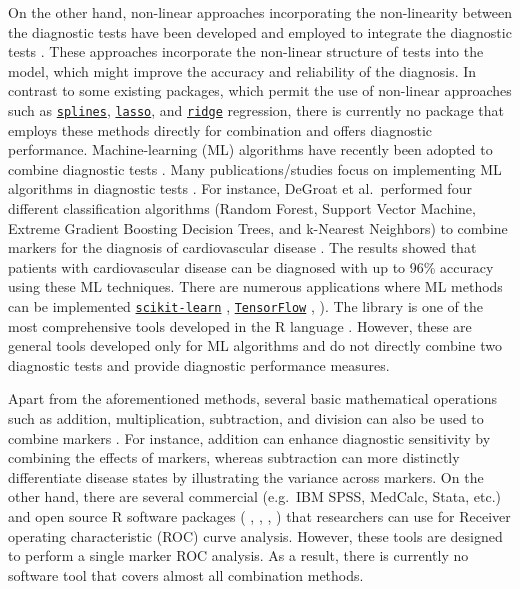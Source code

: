 On the other hand, non-linear approaches incorporating the non-linearity between the diagnostic tests have been developed and employed to integrate the diagnostic tests \citep{du2024likelihood, ghosh2005classification}. These approaches incorporate the non-linear structure of tests into the model, which might improve the accuracy and reliability of the diagnosis. In contrast to some existing packages, which permit the use of non-linear approaches such as \href{https://www.rdocumentation.org/packages/splines/versions/3.6.2}{\texttt{splines}}, \href{https://cran.r-project.org/web/packages/glmnet/index.html}{\texttt{lasso}}, and \href{https://cran.r-project.org/web/packages/glmnet/index.html}{\texttt{ridge}} regression, there is currently no package that employs these methods directly for combination and offers diagnostic performance. Machine-learning (ML) algorithms have recently been adopted to combine diagnostic tests \citep{ahsan2024advancements, sewak2024construction, agarwal2023artificial, prinzi2023explainable}. Many publications/studies focus on implementing ML algorithms in diagnostic tests \citep{salvetat2022game, salvetat2024ai, ganapathy2023comparison, alzyoud2024diagnosing, zararsiz2016statistical}. For instance, DeGroat et al.~performed four different classification algorithms (Random Forest, Support Vector Machine, Extreme Gradient Boosting Decision Trees, and k-Nearest Neighbors) to combine markers for the diagnosis of cardiovascular disease \citep{degroat2024discovering}. The results showed that patients with cardiovascular disease can be diagnosed with up to 96\% accuracy using these ML techniques. There are numerous applications where ML methods can be implemented \href{https://scikit-learn.org/stable/}{\texttt{scikit-learn}} \citep{pedregosa2011scikit}, \href{https://www.tensorflow.org/learn?hl=tr}{\texttt{TensorFlow}} \citep{tensorflow2015-whitepaper},  \citep{kuhn2008building}). The  library is one of the most comprehensive tools developed in the R language \citep{kuhn2008building}. However, these are general tools developed only for ML algorithms and do not directly combine two diagnostic tests and provide diagnostic performance measures.

Apart from the aforementioned methods, several basic mathematical operations such as addition, multiplication, subtraction, and division can also be used to combine markers \citep{svart2024neurofilament, luo2024ast, serban2024significance}. For instance, addition can enhance diagnostic sensitivity by combining the effects of markers, whereas subtraction can more distinctly differentiate disease states by illustrating the variance across markers. On the other hand, there are several commercial (e.g.~IBM SPSS, MedCalc, Stata, etc.) and open source R software packages ( \citep{sing2005rocr},  \citep{robin2011proc},  \citep{grau2015prroc},  \citep{sachs2017plotroc}) that researchers can use for Receiver operating characteristic (ROC) curve analysis. However, these tools are designed to perform a single marker ROC analysis. As a result, there is currently no software tool that covers almost all combination methods.

